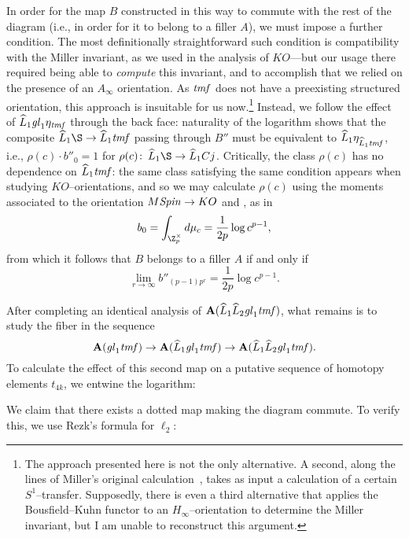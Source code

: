 In order for the map \(B\) constructed in this way to commute with the rest of the diagram (i.e., in order for it to belong to a filler \(A\)), we must impose a further condition.  The most definitionally straightforward such condition is compatibility with the Miller invariant, as we used in the analysis of \(KO\)---but our usage there required being able to \emph{compute} this invariant, and to accomplish that we relied on the presence of an \(A_\infty\) orientation.  As \(\mathit{tmf}\) does not have a preexisting structured orientation, this approach is insuitable for us now.\footnote{The approach presented here is not the only alternative.  A second, along the lines of Miller's original calculation~\cite{MillerBernoulliNos}, takes as input a calculation of a certain \(S^1\)--transfer.  Supposedly, there is even a third alternative that applies the Bousfield--Kuhn functor to an \(H_\infty\)--orientation to determine the Miller invariant, but I am unable to reconstruct this argument.}  Instead, we follow the effect of \(\widehat L_1 \mathit{gl}_1 \eta_{\mathit{tmf}}\) through the back face: naturality of the logarithm shows that the composite \(\widehat L_1 \S \to \widehat L_1 \tmf\) passing through \(B''\) must be equivalent to \(\widehat L_1 \eta_{\widehat L_1 \mathit{tmf}}\), i.e., \(\rho(c) \cdot b''_0 = 1\) for \(\rho(c)\co \widehat L_1 \S \to \widehat L_1 C j\).  Critically, the class \(\rho(c)\) has no dependence on \(\widehat L_1 \mathit{tmf}\): the same class satisfying the same condition appears when studying \(KO\)--orientations, and so we may calculate \(\rho(c)\) using the moments associated to the orientation \(M\mathit{Spin} \to KO\) and , as in \[b_0 = \int_{\Z_p^\times} d\mu_c = \frac{1}{2p} \log c^{p-1},\] from which it follows that \(B\) belongs to a filler \(A\) if and only if \[\lim_{r \to \infty} b''_{(p-1)p^r} = \frac{1}{2p} \log c^{p-1}.\]

After completing an identical analysis of \(\mathbf A(\widehat L_1 \widehat L_2 \mathit{gl}_1 \mathit{tmf})\), what remains is to study the fiber in the sequence \[\mathbf A(\mathit{gl}_1 \mathit{tmf}) \to \mathbf A(\widehat L_1 \mathit{gl}_1 \mathit{tmf}) \to \mathbf A(\widehat L_1 \widehat L_2 \mathit{gl}_1 \mathit{tmf}).\]  To calculate the effect of this second map on a putative sequence of homotopy elements \(t_{4k}\), we entwine the logarithm:
\begin{center}
\end{center}
We claim that there exists a dotted map making the diagram commute.  To verify this, we use Rezk's formula for \(\ell_2\):

